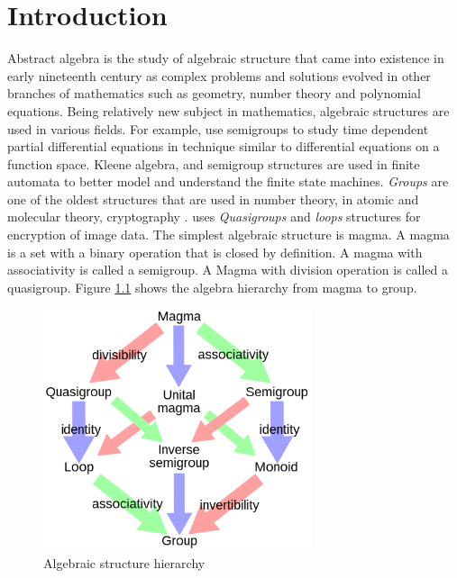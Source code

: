 \chapter{Introduction}
Abstract algebra is the study of algebraic structure that came into existence in
early nineteenth century as complex problems and solutions evolved in other
branches of mathematics such as geometry, number theory and polynomial equations.
Being relatively new subject in mathematics, algebraic structures are used in
various fields. For example, \cite{liaqat2021some} use semigroups  to study time dependent partial differential
equations in technique similar to differential equations on a function space.
Kleene algebra, and semigroup structures are used in finite automata to better model
and understand the finite state machines. \textit{Groups} are one of the oldest
structures that are used in number theory, in atomic and molecular theory,
cryptography \cite{enwiki:1133598242}. \cite{bruck1944some} uses
\textit{Quasigroups} and \textit{loops} structures for encryption of image data.
The simplest algebraic structure is magma. A magma is a set with a binary
operation that is closed by definition. A magma with associativity is
called a semigroup. A Magma with division operation is called a quasigroup. Figure
\ref{fig_magma} shows the algebra hierarchy from magma to group. 
 \begin{figure}[ht]
	\centering
	\includegraphics[width=0.7\textwidth]{figures/Sample/Magma_to_group.jpg}
	\caption{Algebraic structure hierarchy \cite{enwiki:1107380309}}
	\label{fig_magma}
 \end{figure}

